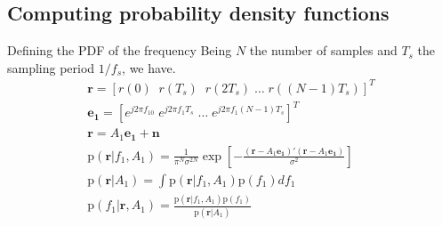 ﻿\documentclass[mathserif]{beamer}
\begin{document}
	
	
	\subsection{Computing probability density functions}
	\begin{frame}{Defining the PDF of the frequency}
		Being $N$ the number of samples and $T_s$ the sampling period $1/f_s$, we have.
		\begin{gather*}
			\mathbf{r} =  [r(0) \; \; r(T_s) \; \; r(2T_s) \; \dots \; r((N-1)T_s)]^T \\
			\mathbf{e_1} =  [e^{j2\pi f_10} \; e^{j2\pi f_1T_s} \; \dots \; e^{j2\pi f_1(N-1)T_s}]^T \\		
			\mathbf{r} = A_1\mathbf{e_1} + \mathbf{n} \\
			\mathrm{p}(\mathbf{r}|f_1,A_1) = \frac{1}{\pi^N\sigma^{2N}}\exp\left[-\frac{(\mathbf{r}-A_1\mathbf{e_1})'
				(\mathbf{r}-A_1\mathbf{e_1})}{\sigma^2}\right] \\
			\mathrm{p}(\mathbf{r}|A_1) = \int \mathrm{p}(\mathbf{r}|f_1,A_1)\mathrm{p}(f_1)df_1\\
			\mathrm{p}(f_1|\mathbf{r},A_1) = \frac{\mathrm{p}(\mathbf{r}|f_1,A_1)\mathrm{p}(f_1)}{\mathrm{p}(\mathbf{r}|A_1)} \\
		\end{gather*}
	\end{frame}
	
\end{document}
